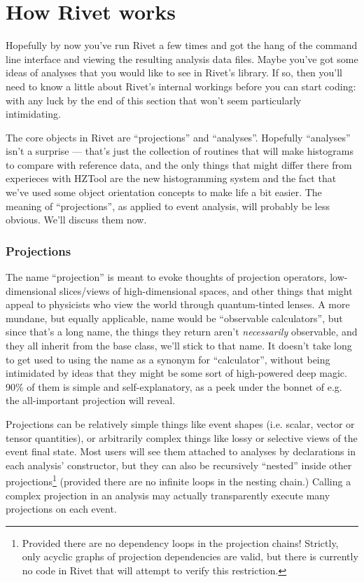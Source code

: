 \documentclass{JHEP3}
\begin{document}




\cleardoublepage
\part{How Rivet works}
\label{part:writinganalyses}

Hopefully by now you've run Rivet a few times and got the hang of the command
line interface and viewing the resulting analysis data files. Maybe you've got
some ideas of analyses that you would like to see in Rivet's library. If so,
then you'll need to know a little about Rivet's internal workings before you can
start coding: with any luck by the end of this section that won't seem
particularly intimidating.

The core objects in Rivet are ``projections'' and ``analyses''. Hopefully
``analyses'' isn't a surprise --- that's just the collection of routines that
will make histograms to compare with reference data, and the only things that
might differ there from experieces with HZTool are the new histogramming system
and the fact that we've used some object orientation concepts to make life a bit
easier. The meaning of ``projections'', as applied to event analysis, will
probably be less obvious. We'll discuss them now.


\section{Projections}

The name ``projection'' is meant to evoke thoughts of projection operators,
low-dimensional slices/views of high-dimensional spaces, and other things that
might appeal to physicists who view the world through quantum-tinted lenses. A
more mundane, but equally applicable, name would be ``observable calculators'',
but since that's a long name, the things they return aren't \emph{necessarily}
observable, and they all inherit from the  base class, we'll
stick to that name. It doesn't take long to get used to using the name as a
synonym for ``calculator'', without being intimidated by ideas that they might
be some sort of high-powered deep magic. 90\% of them is simple and
self-explanatory, as a peek under the bonnet of e.g. the all-important
 projection will reveal.

Projections can be relatively simple things like event shapes (i.e. scalar,
vector or tensor quantities), or arbitrarily complex things like lossy or
selective views of the event final state. Most users will see them attached to
analyses by declarations in each analysis' constructor, but they can also be
recursively ``nested'' inside other projections\footnote{Provided there are no
  dependency loops in the projection chains! Strictly, only acyclic graphs of
  projection dependencies are valid, but there is currently no code in Rivet
  that will attempt to verify this restriction.} (provided there are no infinite
loops in the nesting chain.) Calling a complex projection in an analysis may
actually transparently execute many projections on each event.
\end{document}
